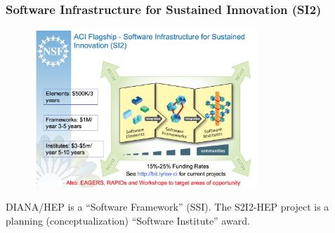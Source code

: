 \begin{frame}
\frametitle{Software Infrastructure for Sustained Innovation (SI2)}

\begin{figure}[htbp]
\begin{center}
\includegraphics[width=0.75\textwidth]{images/ramnath-si2-pi-meeting-2016.png}
\label{fig:nsfsi2}
\end{center}
\end{figure}

DIANA/HEP is a ``Software Framework'' (SSI).  The S2I2-HEP project is a planning (conceptualization) ``Software Institute'' award.

\end{frame}


